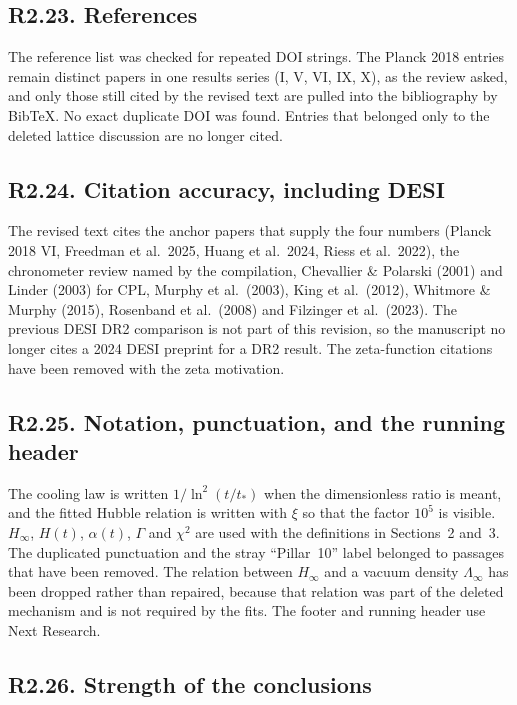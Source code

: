 \documentclass[11pt]{article}
\begin{document}
\subsection*{R2.23. References}

The reference list was checked for repeated DOI strings.
The Planck 2018 entries remain distinct papers in one results series (I, V, VI, IX, X), as the review asked, and only those still cited by the revised text are pulled into the bibliography by Bib\TeX.
No exact duplicate DOI was found.
Entries that belonged only to the deleted lattice discussion are no longer cited.

\subsection*{R2.24. Citation accuracy, including DESI}

The revised text cites the anchor papers that supply the four numbers (Planck 2018 VI, Freedman et al.\ 2025, Huang et al.\ 2024, Riess et al.\ 2022), the chronometer review named by the compilation, Chevallier \& Polarski (2001) and Linder (2003) for CPL, Murphy et al.\ (2003), King et al.\ (2012), Whitmore \& Murphy (2015), Rosenband et al.\ (2008) and Filzinger et al.\ (2023).
The previous DESI DR2 comparison is not part of this revision, so the manuscript no longer cites a 2024 DESI preprint for a DR2 result.
The zeta-function citations have been removed with the zeta motivation.

\subsection*{R2.25. Notation, punctuation, and the running header}

The cooling law is written $1/\ln^{2}(t/t_{*})$ when the dimensionless ratio is meant, and the fitted Hubble relation is written with $\xi$ so that the factor $10^{5}$ is visible.
$H_{\infty}$, $H(t)$, $\alpha(t)$, $\Gamma$ and $\chi^{2}$ are used with the definitions in Sections~2 and~3.
The duplicated punctuation and the stray ``Pillar~10'' label belonged to passages that have been removed.
The relation between $H_{\infty}$ and a vacuum density $\Lambda_{\infty}$ has been dropped rather than repaired, because that relation was part of the deleted mechanism and is not required by the fits.
The footer and running header use Next Research.

\subsection*{R2.26. Strength of the conclusions}
\end{document}
